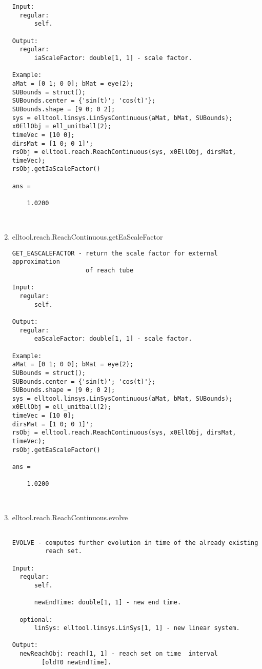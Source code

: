 \begin{enumerate}
\begin{lstlisting}
Input:
  regular:
      self.

Output:
  regular:
      iaScaleFactor: double[1, 1] - scale factor.

Example:
aMat = [0 1; 0 0]; bMat = eye(2);
SUBounds = struct();
SUBounds.center = {'sin(t)'; 'cos(t)'};
SUBounds.shape = [9 0; 0 2];
sys = elltool.linsys.LinSysContinuous(aMat, bMat, SUBounds);
x0EllObj = ell_unitball(2);
timeVec = [10 0];
dirsMat = [1 0; 0 1]';
rsObj = elltool.reach.ReachContinuous(sys, x0EllObj, dirsMat, timeVec);
rsObj.getIaScaleFactor()

ans =

    1.0200



\end{lstlisting}
\fontfamily{\familydefault}
\selectfont
\item {elltool.reach.ReachContinuous.getEaScaleFactor}
\selectfont
\begin{lstlisting}
GET_EASCALEFACTOR - return the scale factor for external approximation
                    of reach tube

Input:
  regular:
      self.

Output:
  regular:
      eaScaleFactor: double[1, 1] - scale factor.

Example:
aMat = [0 1; 0 0]; bMat = eye(2);
SUBounds = struct();
SUBounds.center = {'sin(t)'; 'cos(t)'};
SUBounds.shape = [9 0; 0 2];
sys = elltool.linsys.LinSysContinuous(aMat, bMat, SUBounds);
x0EllObj = ell_unitball(2);
timeVec = [10 0];
dirsMat = [1 0; 0 1]';
rsObj = elltool.reach.ReachContinuous(sys, x0EllObj, dirsMat, timeVec);
rsObj.getEaScaleFactor()

ans =

    1.0200



\end{lstlisting}
\fontfamily{\familydefault}
\selectfont
\item {elltool.reach.ReachContinuous.evolve}
\selectfont
\begin{lstlisting}

EVOLVE - computes further evolution in time of the already existing
         reach set.

Input:
  regular:
      self.

      newEndTime: double[1, 1] - new end time.

  optional:
      linSys: elltool.linsys.LinSys[1, 1] - new linear system.

Output:
  newReachObj: reach[1, 1] - reach set on time  interval
        [oldT0 newEndTime].


\end{lstlisting}
\end{enumerate}
